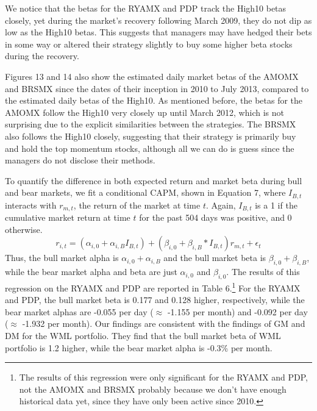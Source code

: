 \documentclass[12pt]{article}
\begin{document}
We notice that the betas for the RYAMX and PDP track the High10 betas closely, yet during the market's recovery following March 2009, they do not dip as low as the High10 betas. This suggests that managers may have hedged their bets in some way or altered their strategy slightly to buy some higher beta stocks during the recovery.

Figures 13 and 14 also show the estimated daily market betas of the AMOMX and BRSMX since the dates of their inception in 2010 to July 2013, compared to the estimated daily betas of the High10. As mentioned before, the betas for the AMOMX follow the High10 very closely up until March 2012, which is not surprising due to the explicit similarities between the strategies. The BRSMX also follows the High10 closely, suggesting that their strategy is primarily buy and hold the top momentum stocks, although all we can do is guess since the managers do not disclose their methods.

To quantify the difference in both expected return and market beta during bull and bear markets, we fit a conditional CAPM, shown in Equation 7, where $I_{B,t}$ interacts with $r_{m,t}$, the return of the market at time $t$. Again, $I_{B,t}$ is a 1 if the cumulative market return at time $t$ for the past 504 days was positive, and 0 otherwise. 
\begin{equation}
r_{i,t}=(\alpha_{i,0}+\alpha_{i,B}I_{B,t})+(\beta_{i,0}+\beta_{i,B}*I_{B,t})r_{m,t}+\epsilon_{t}
\end{equation}
Thus, the bull market alpha is $\alpha_{i,0}+\alpha_{i,B}$ and the bull market beta is $\beta_{i,0}+\beta_{i,B}$, while the bear market alpha and beta are just $\alpha_{i,0}$ and $\beta_{i,0}$. The results of this regression on the RYAMX and PDP are reported in Table 6.\footnote{The results of this regression were only significant for the RYAMX and PDP, not the AMOMX and BRSMX probably because we don't have enough historical data yet, since they have only been active since 2010.} For the RYAMX and PDP, the bull market beta is 0.177 and 0.128 higher, respectively, while the bear market alphas are -0.055 per day ($\approx$ -1.155 per month) and -0.092 per day ($\approx$ -1.932 per month). Our findings are consistent with the findings of GM and DM for the WML portfolio. They find that the bull market beta of WML portfolio is 1.2 higher, while the bear market alpha is -0.3\% per month.
\end{document}
